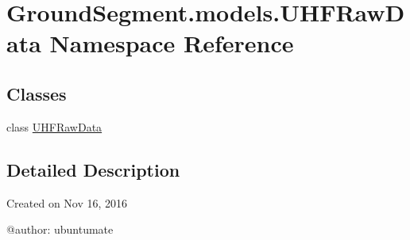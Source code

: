 \hypertarget{namespace_ground_segment_1_1models_1_1_u_h_f_raw_data}{}\section{Ground\+Segment.\+models.\+U\+H\+F\+Raw\+Data Namespace Reference}
\label{namespace_ground_segment_1_1models_1_1_u_h_f_raw_data}
\subsection*{Classes}
\begin{DoxyCompactItemize}
\item 
class \hyperlink{class_ground_segment_1_1models_1_1_u_h_f_raw_data_1_1_u_h_f_raw_data}{U\+H\+F\+Raw\+Data}
\end{DoxyCompactItemize}


\subsection{Detailed Description}
\begin{DoxyVerb}Created on Nov 16, 2016

@author: ubuntumate
\end{DoxyVerb}
 